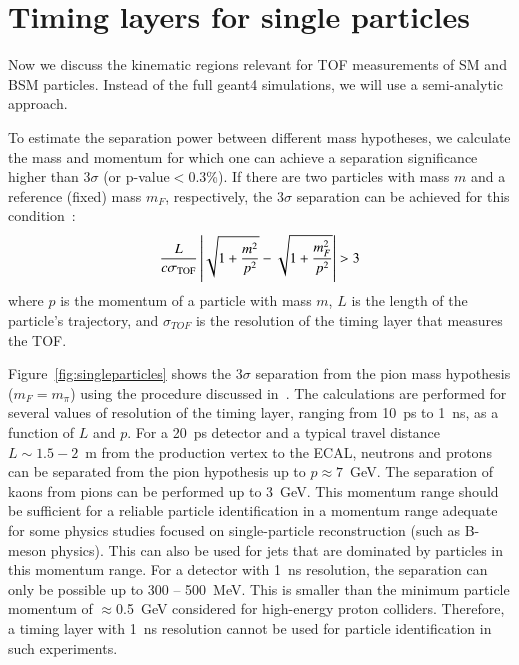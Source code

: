 \section{Timing layers for single particles}

Now we discuss the kinematic regions  relevant for  TOF measurements of SM and BSM particles. Instead of the full {\sc geant}4 simulations, we will
use a semi-analytic approach.  
 
To estimate the separation power between different mass hypotheses, we calculate the mass and momentum for which one can achieve a separation 
 significance higher than $3\sigma$ (or p-value$<0.3$\%). 
If there are two particles with mass $m$ and a reference (fixed) mass $m_F$, respectively, the $3\sigma$ separation can be 
achieved for this condition~\cite{Cerri:2018rkm}:
\begin{equation}
\frac{L}{c \sigma_{\textsc{TOF}}}\left|\sqrt{1+\frac{m^2}{p^2}} - \sqrt{1+\frac{m_F^2}{p^2}}\right| > 3
\label{eqTOF}
\end{equation}
where $p$ is the momentum of a particle with mass $m$, $L$  is the length of the particle's trajectory, 
and $\sigma_{TOF}$ is the
resolution  of the timing layer that measures the TOF.

Figure~\ref{fig:singleparticles} shows the $3\sigma$ separation from the pion
mass hypothesis ($m_F=m_{\pi}$) using the procedure discussed  in~\cite{Cerri:2018rkm}. The 
calculations are performed for several values of resolution of the timing layer, ranging from 10~ps to 1~ns,
as a function of $L$ and $p$. For a 20~ps detector and a typical travel 
distance $L\sim 1.5-2$~m from the production vertex to the ECAL, neutrons and protons can be separated from the pion hypothesis up to $p \approx 7$~GeV. 
The separation of kaons from pions can be performed up to 3~GeV.
This momentum range should be sufficient for a reliable particle 
identification in a momentum range adequate for some physics studies focused on
single-particle reconstruction (such as B-meson physics).
This can also be used for jets that are dominated
by particles in this momentum range.
For a detector  with 1~ns resolution, the separation can only be possible  up to  300 -- 500~MeV. This is smaller than the 
minimum particle momentum of $\approx$0.5~GeV considered for high-energy proton colliders.
Therefore, a timing layer with 1~ns resolution cannot be used for particle identification in such experiments.


